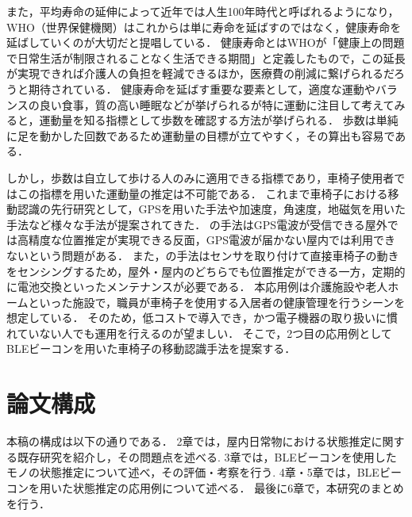 また，平均寿命の延伸によって近年では人生100年時代と呼ばれるようになり，WHO（世界保健機関）はこれからは単に寿命を延ばすのではなく，健康寿命を延ばしていくのが大切だと提唱している．
健康寿命とはWHOが「健康上の問題で日常生活が制限されることなく生活できる期間」\cite{WHO}と定義したもので，この延長が実現できれば介護人の負担を軽減できるほか，医療費の削減に繋げられるだろうと期待されている．
健康寿命を延ばす重要な要素として，適度な運動やバランスの良い食事，質の高い睡眠などが挙げられるが特に運動に注目して考えてみると，運動量を知る指標として歩数を確認する方法が挙げられる．
歩数は単純に足を動かした回数であるため運動量の目標が立てやすく，その算出も容易である．

しかし，歩数は自立して歩ける人のみに適用できる指標であり，車椅子使用者ではこの指標を用いた運動量の推定は不可能である．
これまで車椅子における移動認識の先行研究として，GPSを用いた手法\cite{gps}や加速度，角速度，地磁気を用いた手法\cite{baske}など様々な手法が提案されてきた．
\cite{gps}の手法はGPS電波が受信できる屋外では高精度な位置推定が実現できる反面，GPS電波が届かない屋内では利用できないという問題がある．
また，\cite{baske}の手法はセンサを取り付けて直接車椅子の動きをセンシングするため，屋外・屋内のどちらでも位置推定ができる一方，定期的に電池交換といったメンテナンスが必要である．
本応用例は介護施設や老人ホームといった施設で，職員が車椅子を使用する入居者の健康管理を行うシーンを想定している．
そのため，低コストで導入でき，かつ電子機器の取り扱いに慣れていない人でも運用を行えるのが望ましい．
そこで，2つ目の応用例としてBLEビーコンを用いた車椅子の移動認識手法を提案する．

\section{論文構成}
本稿の構成は以下の通りである．
2章では，屋内日常物における状態推定に関する既存研究を紹介し，その問題点を述べる.
3章では，BLEビーコンを使用したモノの状態推定について述べ，その評価・考察を行う.
4章・5章では，BLEビーコンを用いた状態推定の応用例について述べる．
最後に6章で，本研究のまとめを行う．